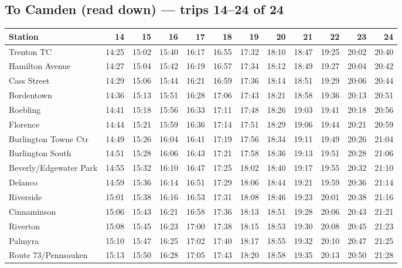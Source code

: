 \subsection*{To Camden (read down) --- trips 14--24 of 24}
\begin{center}\footnotesize\setlength{\tabcolsep}{3pt}\begin{tabular}{@{}lrrrrrrrrrrr@{}}\toprule
Station & 14 & 15 & 16 & 17 & 18 & 19 & 20 & 21 & 22 & 23 & 24 \\\midrule
Trenton TC & 14:25 & 15:02 & 15:40 & 16:17 & 16:55 & 17:32 & 18:10 & 18:47 & 19:25 & 20:02 & 20:40 \\
Hamilton Avenue & 14:27 & 15:04 & 15:42 & 16:19 & 16:57 & 17:34 & 18:12 & 18:49 & 19:27 & 20:04 & 20:42 \\
Cass Street & 14:29 & 15:06 & 15:44 & 16:21 & 16:59 & 17:36 & 18:14 & 18:51 & 19:29 & 20:06 & 20:44 \\
Bordentown & 14:36 & 15:13 & 15:51 & 16:28 & 17:06 & 17:43 & 18:21 & 18:58 & 19:36 & 20:13 & 20:51 \\
Roebling & 14:41 & 15:18 & 15:56 & 16:33 & 17:11 & 17:48 & 18:26 & 19:03 & 19:41 & 20:18 & 20:56 \\
Florence & 14:44 & 15:21 & 15:59 & 16:36 & 17:14 & 17:51 & 18:29 & 19:06 & 19:44 & 20:21 & 20:59 \\
Burlington Towne Ctr & 14:49 & 15:26 & 16:04 & 16:41 & 17:19 & 17:56 & 18:34 & 19:11 & 19:49 & 20:26 & 21:04 \\
Burlington South & 14:51 & 15:28 & 16:06 & 16:43 & 17:21 & 17:58 & 18:36 & 19:13 & 19:51 & 20:28 & 21:06 \\
Beverly/Edgewater Park & 14:55 & 15:32 & 16:10 & 16:47 & 17:25 & 18:02 & 18:40 & 19:17 & 19:55 & 20:32 & 21:10 \\
Delanco & 14:59 & 15:36 & 16:14 & 16:51 & 17:29 & 18:06 & 18:44 & 19:21 & 19:59 & 20:36 & 21:14 \\
Riverside & 15:01 & 15:38 & 16:16 & 16:53 & 17:31 & 18:08 & 18:46 & 19:23 & 20:01 & 20:38 & 21:16 \\
Cinnaminson & 15:06 & 15:43 & 16:21 & 16:58 & 17:36 & 18:13 & 18:51 & 19:28 & 20:06 & 20:43 & 21:21 \\
Riverton & 15:08 & 15:45 & 16:23 & 17:00 & 17:38 & 18:15 & 18:53 & 19:30 & 20:08 & 20:45 & 21:23 \\
Palmyra & 15:10 & 15:47 & 16:25 & 17:02 & 17:40 & 18:17 & 18:55 & 19:32 & 20:10 & 20:47 & 21:25 \\
Route 73/Pennsauken & 15:13 & 15:50 & 16:28 & 17:05 & 17:43 & 18:20 & 18:58 & 19:35 & 20:13 & 20:50 & 21:28 \\

\end{tabular}
\end{center}
